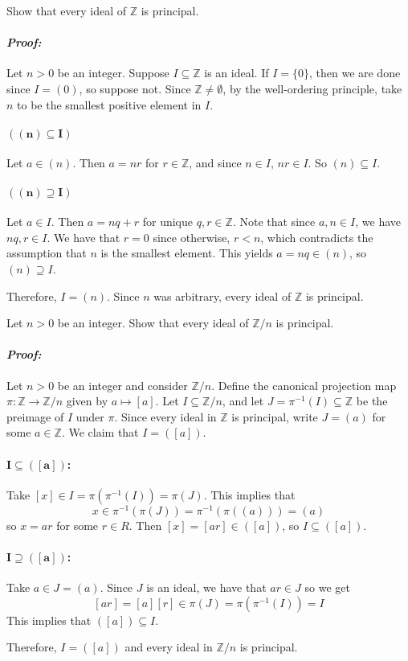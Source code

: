 \documentclass [12pt] {article}
\newcommand{\Z}{\mathbb{Z}}
\renewcommand{\it}[1]{\textit{{#1}}}
\newenvironment{problem}{\begin{tcolorbox}[title=Problem,colback=black!5!white,colframe=black!75!black]}{\end{tcolorbox}}
\newenvironment{response}{\begin{responseframe}\vspace{-10pt}\paragraph{\it{Proof:}}}{\end{responseframe}}
\begin{document}
\begin{problem}
    Show that every ideal of $\Z$ is principal.
\end{problem}
\begin{response}
    Let $n>0$ be an integer. Suppose $I\subseteq \Z$ is an ideal. If $I=\{0\}$,
    then we are done since $I=(0)$, so suppose not. Since $\Z\neq \emptyset$,
    by the well-ordering principle, take $n$ to be the smallest positive
    element in $I$.

    \paragraph{$\bm{((n)\subseteq I)}$} Let $a\in (n)$. Then $a = nr$ for
    $r\in \Z$, and since $n\in I$, $nr\in I$. So $(n)\subseteq I$.

    \paragraph{$\bm{((n)\supseteq I)}$} Let $a\in I$. Then $a=nq+r$ for unique
    $q,r\in \Z$. Note that since $a,n\in I$, we have $nq,r\in I$. We have that
    $r=0$ since otherwise, $r<n$, which contradicts the assumption that $n$ is
    the smallest element. This yields $a=nq\in (n)$, so $(n)\supseteq I$.
    \vspace{1em}

    Therefore, $I=(n)$. Since $n$ was arbitrary, every ideal of $\Z$ is
    principal.
\end{response}

\begin{problem}
    Let $n>0$ be an integer. Show that every ideal of $\Z/n$ is principal.
\end{problem}
\begin{response}
    Let $n>0$ be an integer and consider $\Z/n$. Define the canonical projection
    map $\pi : \Z\to \Z/n$ given by $a\mapsto [a]$. Let $I\subseteq \Z/n$, and let
    $J=\pi^{-1}(I)\subseteq \Z$ be the preimage of $I$ under $\pi$. Since every
    ideal in $\Z$ is principal, write $J=(a)$ for some $a\in \Z$. We claim that
    $I=([a])$.

    \paragraph{$\bm{I\subseteq ([a])}$:} Take $[x]\in I=\pi(\pi^{-1}(I))=\pi(J)$.
    This implies that
    \[x\in \pi^{-1}(\pi(J))=\pi^{-1}(\pi((a)))=(a)\]
    so $x=ar$ for some $r\in R$. Then $[x]=[ar]\in ([a])$, so $I\subseteq ([a])$.

    \paragraph{$\bm{I\supseteq ([a])}$:} Take $a\in J=(a)$. Since $J$ is an
    ideal, we have that $ar\in J$ so we get
    \[[ar]=[a][r]\in \pi(J)=\pi(\pi^{-1}(I))=I\]
    This implies that $([a])\subseteq I$.
    \vspace{1em}

    Therefore, $I=([a])$ and every ideal in $\Z/n$ is principal.
\end{response}
\end{document}
